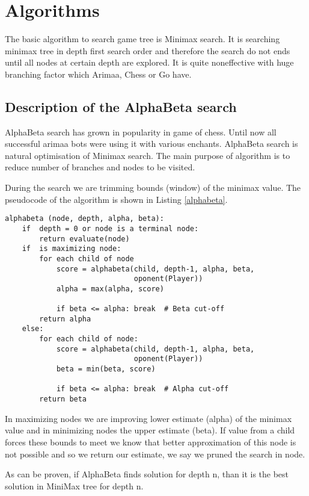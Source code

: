 \chapter{Algorithms}

The basic algorithm to search game tree is Minimax search. It is searching
minimax tree in depth first search order and therefore the search do not ends
until all nodes at certain depth are explored. It is quite noneffective with
huge branching factor which Arimaa, Chess or Go have.

\section{Description of the AlphaBeta search}
AlphaBeta search has grown in popularity in game of chess. Until now all
successful arimaa bots were using it with various enchants. AlphaBeta search is
natural optimisation of Minimax search. The main purpose of algorithm is to
reduce number of branches and nodes to be visited.

During the search we are trimming bounds (window) of the minimax value. The
pseudocode of the algorithm is shown in Listing \ref{alphabeta}.

\lstset{language=Python, caption=Pseudocode of AlphaBeta search, label=alphabeta}
\begin{lstlisting}
alphabeta (node, depth, alpha, beta):
    if  depth = 0 or node is a terminal node:
        return evaluate(node)
    if  is maximizing node:
        for each child of node
            score = alphabeta(child, depth-1, alpha, beta,
                              oponent(Player))
            alpha = max(alpha, score)

            if beta <= alpha: break  # Beta cut-off
        return alpha
    else:
        for each child of node:
            score = alphabeta(child, depth-1, alpha, beta,
                              oponent(Player))
            beta = min(beta, score)

            if beta <= alpha: break  # Alpha cut-off
        return beta
\end{lstlisting}

In maximizing nodes we are improving lower estimate (alpha) of the minimax
value and in minimizing nodes the upper estimate (beta). If value from a child
forces these bounds to meet we know that better approximation of this node is
not possible and so we return our estimate, we say we pruned the search in
node.

As can be proven, if AlphaBeta finds solution for depth n, than it is the best
solution in MiniMax tree for depth n\cite{knuth:alphabeta}.

